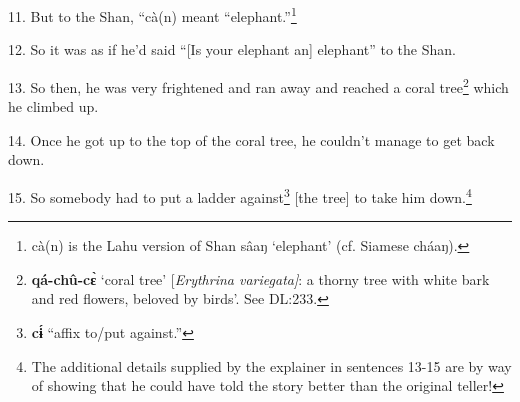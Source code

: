 11. But to the Shan, ``cà(n) meant ``elephant.''\footnote{cà(n) is the Lahu version of Shan sâaŋ `elephant' (cf. Siamese cháaŋ).}

12. So it was as if he'd said ``[Is your elephant an] elephant''
to the Shan.

13. So then, he was very frightened and ran away and reached a coral tree\footnote{\textbf{qá-chû-cɛ̀} `coral tree' [\textit{Erythrina variegata]}: a thorny tree with white bark and red flowers, beloved by birds'. See DL:233.}
which he climbed up.

14. Once he got up to the top of the coral tree, he couldn't manage to get back
down.

15. So somebody had to put a ladder against\footnote{\textbf{cɨ́} ``affix to/put against.''} [the tree] to take him down.\footnote{The additional details supplied by the explainer in sentences 13-15 are by way of showing that he could have told the story better than the original teller!}

